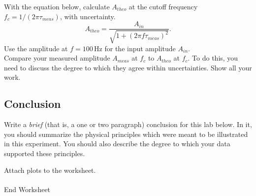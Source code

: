 With the equation below, calculate $A_{theo}$ at the cutoff frequency $f_c=1/(2 \pi \tau_{meas})$, with uncertainty.\\
$$ 
A_{theo} = \frac{A_{in}}{\sqrt {1+(2\pi f \tau_{meas})^2} }.  
$$
\noindent Use the amplitude at $f=100 \, \mathrm{Hz} $ for the input amplitude $A_{in}$.\\

\noindent Compare your measured amplitude $A_{meas}$ at $f_c$ to 
$A_{theo}$ at $f_c$. To do this, you need to  discuss the
degree to which they agree within uncertainties.  
Show all your work. \\
\vspace*{3cm}
\clearpage
\subsection{Conclusion}

Write a {\it brief} (that is, a one or two paragraph) conclusion for
this lab below. In it, you should summarize the physical
principles which were meant to be illustrated in this experiment. You
should also describe the degree to which your data supported these
principles.

\vfill
\noindent Attach plots to the worksheet. \\
\ \\
{\Large End Worksheet} 
 

\renewcommand{\thesection}{\thechapter.\arabic{section}}
